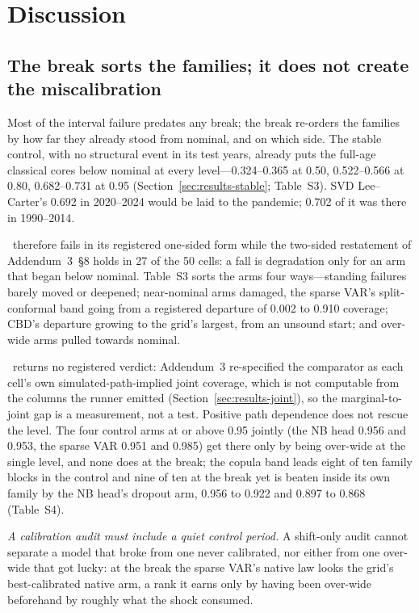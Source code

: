 \section{Discussion}
\label{sec:discussion}

\subsection{The break sorts the families; it does not create the miscalibration}
\label{sec:discussion-standing}

Most of the interval failure predates any break; the break re-orders the
families by how far they already stood from nominal, and on which side. The
stable control, with no structural event in its test years, already puts the
full-age classical cores below nominal at every level---0.324--0.365 at 0.50,
0.522--0.566 at 0.80, 0.682--0.731 at 0.95 (Section~\ref{sec:results-stable};
Table~S3). SVD Lee--Carter's 0.692 in 2020--2024 would be laid to the pandemic;
0.702 of it was there in 1990--2014.

\Htwo\ therefore fails in its registered one-sided form while the two-sided
restatement of Addendum~3~\S8 holds in 27 of the 50 cells: a fall is
degradation only for an arm that began below nominal. Table~S3 sorts the arms
four ways---standing failures barely moved or deepened; near-nominal arms
damaged, the sparse VAR's split-conformal band going from a registered
departure of 0.002 to 0.910 coverage; CBD's departure growing to the grid's
largest, from an unsound start; and over-wide arms pulled towards nominal.

\Hthree\ returns no registered verdict: Addendum~3 re-specified the comparator
as each cell's own simulated-path-implied joint coverage, which is not
computable from the columns the runner emitted
(Section~\ref{sec:results-joint}), so the marginal-to-joint gap is a
measurement, not a test. Positive path dependence does not rescue the level.
The four control arms at or above 0.95 jointly (the NB head 0.956 and 0.953,
the sparse VAR 0.951 and 0.985) get there only by being over-wide at the single
level, and none does at the break; the copula band leads eight of ten family
blocks in the control and nine of ten at the break yet is beaten inside its own
family by the NB head's dropout arm, 0.956 to 0.922 and 0.897 to 0.868
(Table~S4).

\emph{A calibration audit must include a quiet control period.} A shift-only
audit cannot separate a model that broke from one never calibrated, nor either
from one over-wide that got lucky: at the break the sparse VAR's native law
looks the grid's best-calibrated native arm, a rank it earns only by having
been over-wide beforehand by roughly what the shock consumed.

